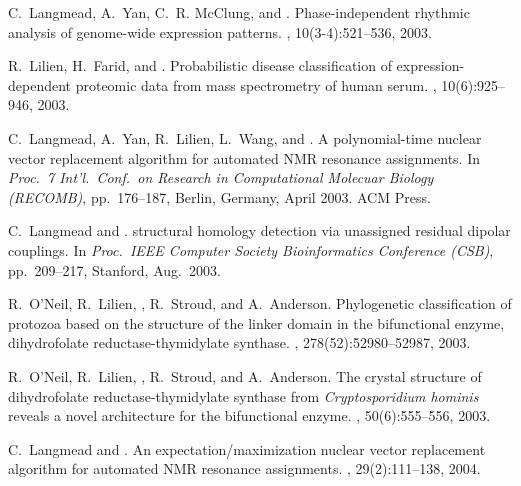 \documentclass[11pt]{nih}
\begin{document}
\begin{Enumerate}
C.~Langmead, A.~Yan, C.~R. McClung, and {\brd}.
\newblock Phase-independent rhythmic analysis of genome-wide expression
  patterns.
, 10(3-4):521--536, 2003.

R.~Lilien, H.~Farid, and {\brd}.
\newblock Probabilistic disease classification of expression-dependent
  proteomic data from mass spectrometry of human serum.
, 10(6):925--946, 2003.

C.~Langmead, A.~Yan, R.~Lilien, L.~Wang, and {\brd}.
\newblock A polynomial-time nuclear vector replacement algorithm for automated
  {NMR} resonance assignments.
\newblock In {\em Proc.~7{\th} Int'l.~Conf.~on
  Research in Computational Molecuar Biology (RECOMB)}, pp.~176--187,
  Berlin, Germany, April 2003. ACM Press.

C.~Langmead and {\brd}.
 structural homology detection via unassigned residual dipolar
  couplings.
\newblock In {\em Proc.~{IEEE} Computer Society Bioinformatics
  Conference ({CSB})}, pp.~209--217, Stanford, Aug.~2003.

R.~O'Neil, R.~Lilien, {\brd}, R.~Stroud, and A.~Anderson.
\newblock Phylogenetic classification of protozoa based on the structure of the
  linker domain in the bifunctional enzyme, dihydrofolate reductase-thymidylate
  synthase.
, 278(52):52980--52987, 2003.

R.~O'Neil, R.~Lilien, {\brd}, R.~Stroud, and A.~Anderson.
\newblock The crystal structure of dihydrofolate reductase-thymidylate synthase
  from {{\em Cryptosporidium hominis}} reveals a novel architecture for the
  bifunctional enzyme.
, 50(6):555--556, 2003.


C.~Langmead and {\brd}.
\newblock An expectation/maximization nuclear vector replacement algorithm for
  automated {NMR} resonance assignments.
, 29(2):111--138, 2004.


\end{Enumerate}
\end{document}
